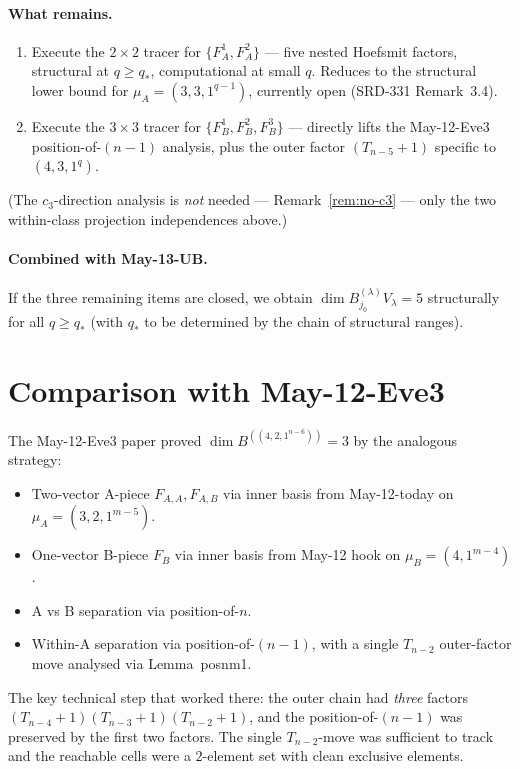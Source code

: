 \documentclass[11pt]{article}
\theoremstyle{definition}
\begin{document}
\paragraph{What remains.}
\begin{enumerate}[leftmargin=2em,topsep=0.2em,itemsep=0.1em]
\item Execute the $2 \times 2$ tracer for $\{F_A^1, F_A^2\}$ — five
nested Hoefsmit factors, structural at $q \ge q_*$, computational at
small $q$. Reduces to the structural lower bound for
$\mu_A = (3, 3, 1^{q-1})$, currently open
(SRD-331 Remark~3.4).
\item Execute the $3 \times 3$ tracer for
$\{F_B^1, F_B^2, F_B^3\}$ — directly lifts the May-12-Eve3
position-of-$(n-1)$ analysis, plus the outer factor $(T_{n-5}+1)$
specific to $(4, 3, 1^q)$.
\end{enumerate}
(The $c_3$-direction analysis is \emph{not} needed —
Remark~\ref{rem:no-c3} — only the two within-class projection
independences above.)

\paragraph{Combined with May-13-UB.}
If the three remaining items are closed, we obtain
$\dim B^{(\lambda)}_{j_0} V_\lambda = 5$ structurally for all
$q \ge q_*$ (with $q_*$ to be determined by the chain of structural
ranges).

\section{Comparison with May-12-Eve3}\label{sec:comparison}

The May-12-Eve3 paper proved $\dim B^{((4, 2, 1^{n-6}))} = 3$ by
the analogous strategy:
\begin{itemize}[leftmargin=2em,topsep=0.2em,itemsep=0.1em]
\item Two-vector A-piece $F_{A,A}, F_{A,B}$ via inner basis from
May-12-today on $\mu_A = (3, 2, 1^{m-5})$.
\item One-vector B-piece $F_B$ via inner basis from May-12 hook on
$\mu_B = (4, 1^{m-4})$.
\item A vs B separation via position-of-$n$.
\item Within-A separation via position-of-$(n-1)$, with a single
$T_{n-2}$ outer-factor move analysed via Lemma~posnm1.
\end{itemize}

The key technical step that worked there: the outer chain had
\emph{three} factors $(T_{n-4}+1)(T_{n-3}+1)(T_{n-2}+1)$, and the
position-of-$(n-1)$ was preserved by the first two factors. The
single $T_{n-2}$-move was sufficient to track and the reachable
cells were a $2$-element set with clean exclusive elements.
\end{document}
